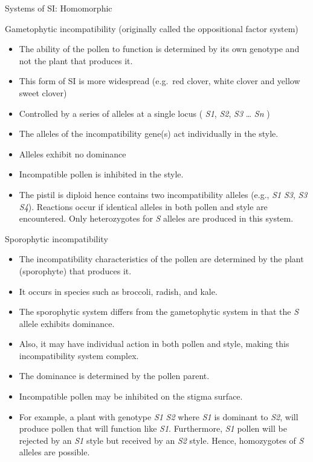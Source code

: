 \documentclass[11pt,ignorenonframetext,aspectratio=169]{beamer}
\providecommand{\tightlist}{%
  \setlength{\itemsep}{0pt}\setlength{\parskip}{0pt}}
\begin{document}
\begin{frame}{Systems of SI: Homomorphic}
\protect\hypertarget{systems-of-si-homomorphic}{}
\begin{block}{Gametophytic incompatibility (originally called the
oppositional factor system)}
\protect\hypertarget{gametophytic-incompatibility-originally-called-the-oppositional-factor-system}{}
\begin{itemize}
\tightlist
\item
  The ability of the pollen to function is determined by its own
  genotype and not the plant that produces it.
\item
  This form of SI is more widespread (e.g.~red clover, white clover and
  yellow sweet clover)
\item
  Controlled by a series of alleles at a single locus ( \emph{S1},
  \emph{S2}, \emph{S3} \ldots{} \emph{Sn} )
\item
  The alleles of the incompatibility gene(s) act individually in the
  style.
\item
  Alleles exhibit no dominance
\item
  Incompatible pollen is inhibited in the style.
\item
  The pistil is diploid hence contains two incompatibility alleles
  (e.g., \emph{S1} \emph{S3}, \emph{S3} \emph{S4}). Reactions occur if
  identical alleles in both pollen and style are encountered. Only
  heterozygotes for \emph{S} alleles are produced in this system.
\end{itemize}
\end{block}
\end{frame}

\begin{frame}{}
\protect\hypertarget{section-7}{}
\begin{block}{Sporophytic incompatibility}
\protect\hypertarget{sporophytic-incompatibility}{}
\begin{itemize}
\tightlist
\item
  The incompatibility characteristics of the pollen are determined by
  the plant (sporophyte) that produces it.
\item
  It occurs in species such as broccoli, radish, and kale.
\item
  The sporophytic system differs from the gametophytic system in that
  the \emph{S} allele exhibits dominance.
\item
  Also, it may have individual action in both pollen and style, making
  this incompatibility system complex.
\item
  The dominance is determined by the pollen parent.
\item
  Incompatible pollen may be inhibited on the stigma surface.
\item
  For example, a plant with genotype \emph{S1} \emph{S2} where \emph{S1}
  is dominant to \emph{S2}, will produce pollen that will function like
  \emph{S1}. Furthermore, \emph{S1} pollen will be rejected by an
  \emph{S1} style but received by an \emph{S2} style. Hence, homozygotes
  of \emph{S} alleles are possible.
\end{itemize}
\end{block}
\end{frame}
\end{document}
